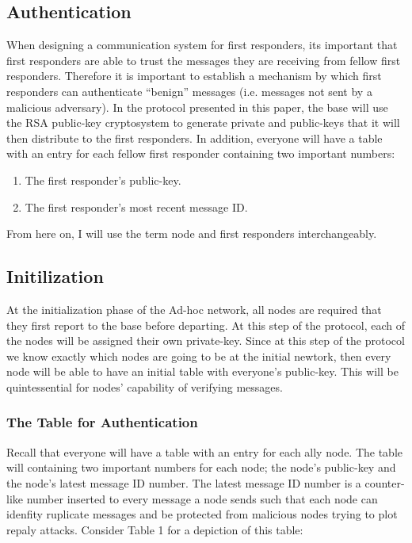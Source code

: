 \documentclass[letterpaper]{article}
\begin{document}
\subsection{Authentication}
When designing a communication system for first responders, its important that first responders are able to trust the messages they are receiving from fellow first responders. Therefore it is important to establish a mechanism by which first responders can authenticate “benign” messages (i.e. messages not sent by a malicious adversary). In the protocol presented in this paper, the base will use the RSA public-key cryptosystem to generate private and public-keys that it will then distribute to the first responders. In addition, everyone will have a table with an entry for each fellow first responder containing two important numbers:

\begin{enumerate}
  \item The first responder's public-key. 
  \item The first responder's most recent message ID.
\end{enumerate}

From here on, I will use the term node and first responders interchangeably.

\subsection{Initilization}
At the initialization phase of the Ad-hoc network, all nodes are required that they first report to the base before departing. 
At this step of the protocol, each of the nodes will be assigned their own private-key. 
Since at this step of the protocol we know exactly which nodes are going to be at the initial newtork, then every node will be able to have an initial table with everyone's public-key. 
This will be quintessential for nodes' capability of verifying messages.

\subsubsection{The Table for Authentication}
Recall that everyone will have a table with an entry for each ally node. The table will containing two important numbers for each node; the node's public-key and the node's latest message ID number. The latest message ID number is a counter-like number inserted to every message a node sends such that each node can idenfity ruplicate messages and be protected from malicious nodes trying to plot repaly attacks. Consider Table 1 for a depiction of this table:
\end{document}
